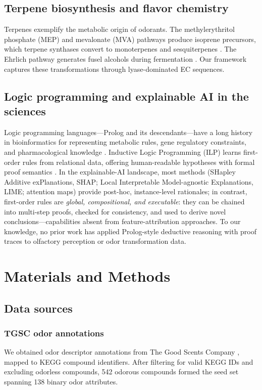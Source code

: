 \documentclass[a4paper,fleqn]{cas-sc}
\begin{document}
\subsection{Terpene biosynthesis and flavor chemistry}

Terpenes exemplify the metabolic origin of odorants. The methylerythritol phosphate (MEP) and mevalonate (MVA) pathways produce isoprene precursors, which terpene synthases convert to monoterpenes and sesquiterpenes \citep{Tholl2015}. The Ehrlich pathway generates fusel alcohols during fermentation \citep{Hazelwood2008}. Our framework captures these transformations through lyase-dominated EC sequences.

\subsection{Logic programming and explainable AI in the sciences}

Logic programming languages---Prolog and its descendants---have a long history in bioinformatics for representing metabolic rules, gene regulatory constraints, and pharmacological knowledge \citep{Muggleton1994}. Inductive Logic Programming (ILP) learns first-order rules from relational data, offering human-readable hypotheses with formal proof semantics \citep{Cropper2022}. In the explainable-AI landscape, most methods (SHapley Additive exPlanations, SHAP; Local Interpretable Model-agnostic Explanations, LIME; attention maps) provide post-hoc, instance-level rationales; in contrast, first-order rules are \emph{global, compositional, and executable}: they can be chained into multi-step proofs, checked for consistency, and used to derive novel conclusions---capabilities absent from feature-attribution approaches. To our knowledge, no prior work has applied Prolog-style deductive reasoning with proof traces to olfactory perception or odor transformation data.

\section{Materials and Methods}\label{sec:methods}

\subsection{Data sources}

\subsubsection{TGSC odor annotations}
We obtained odor descriptor annotations from The Good Scents Company \citep{TGSC2024}, mapped to KEGG compound identifiers. After filtering for valid KEGG IDs and excluding odorless compounds, 542 odorous compounds formed the seed set spanning 138 binary odor attributes.
\end{document}
